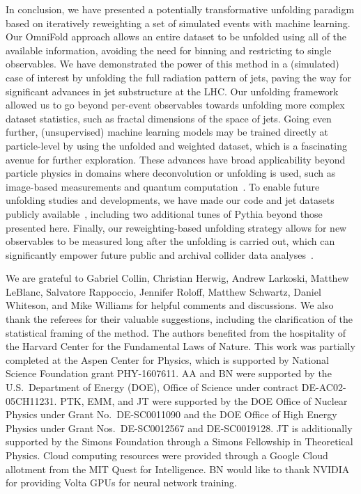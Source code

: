 \documentclass[prl,twocolumn,superscriptaddress,longbibliography,preprintnumbers,nofootinbib]{revtex4-1}
\newcommand{\Pythia}{{\sc Pythia}\xspace}
\newcommand{\OmniFold}{{\sc OmniFold}\xspace}
\begin{document}
In conclusion, we have presented a potentially transformative unfolding paradigm based on iteratively reweighting a set of simulated events with machine learning.
%
Our \OmniFold approach allows an entire dataset to be unfolded using all of the available information, avoiding the need for binning and restricting to single observables.
%
We have demonstrated the power of this method in a (simulated) case of interest by unfolding the full radiation pattern of jets, paving the way for significant advances in jet substructure at the LHC.
%
Our unfolding framework allowed us to go beyond per-event observables towards unfolding more complex dataset statistics, such as fractal dimensions of the space of jets.
%
Going even further, (unsupervised) machine learning models may be trained directly at particle-level by using the unfolded and weighted dataset, which is a fascinating avenue for further exploration.
%
These advances have broad applicability beyond particle physics in domains where deconvolution or unfolding is used, such as image-based measurements and quantum computation~\cite{qisunfolding}.
%
To enable future unfolding studies and developments, we have made our code and jet datasets publicly available~\cite{omnifoldcode,omnifoldsamples}, including two additional tunes of \Pythia beyond those presented here.
%
Finally, our reweighting-based unfolding strategy allows for new observables to be measured long after the unfolding is carried out, which can significantly empower future public and archival collider data analyses~\cite{OpenNotEnough}.

\acknowledgments

We are grateful to Gabriel Collin, Christian Herwig,  Andrew Larkoski, Matthew LeBlanc, Salvatore Rappoccio, Jennifer Roloff, Matthew Schwartz, Daniel Whiteson, and Mike Williams for helpful comments and discussions.
%
We also thank the referees for their valuable suggestions, including the clarification of the statistical framing of the method.
%
The authors benefited from the hospitality of the Harvard Center for the Fundamental Laws of Nature.
%
This work was partially completed at the Aspen Center for Physics, which is supported by National Science Foundation grant PHY-1607611.
%
AA and BN were supported by the U.S.~Department of Energy (DOE), Office of Science under contract DE-AC02-05CH11231. 
%
PTK, EMM, and JT were supported by the DOE Office of Nuclear Physics under Grant No.\ DE-SC0011090 and the DOE Office of High Energy Physics under Grant Nos.\ DE-SC0012567 and DE-SC0019128.
%
JT is additionally supported by the Simons Foundation through a Simons Fellowship in Theoretical Physics.
%
Cloud computing resources were provided through a Google Cloud allotment from the MIT Quest for Intelligence.
%
BN would like to thank NVIDIA for providing Volta GPUs for neural network training.
\end{document}
